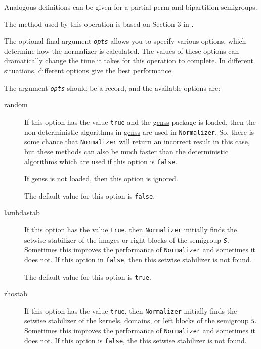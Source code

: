 \documentclass[a4paper,11pt]{report}
\begin{document}
{{{ Analogous definitions can be given for a partial perm and bipartition
semigroups.

 The method used by this operation is based on Section 3 in \cite{Araujo2010aa}.

 The optional final argument \mbox{\texttt{\mdseries\slshape opts}} allows you to specify various options, which determine how the normalizer is
calculated. The values of these options can dramatically change the time it
takes for this operation to complete. In different situations, different
options give the best performance. 

 The argument \mbox{\texttt{\mdseries\slshape opts}} should be a record, and the available options are: 
\begin{description}
\item[{random}]  If this option has the value \texttt{true} and the \href{ http://www-groups.mcs.st-and.ac.uk/~neunhoef/Computer/Software/Gap/genss.html } {genss} package is loaded, then the non-deterministic algorithms in \href{ http://www-groups.mcs.st-and.ac.uk/~neunhoef/Computer/Software/Gap/genss.html } {genss} are used in \texttt{Normalizer}. So, there is some chance that \texttt{Normalizer} will return an incorrect result in this case, but these methods can also be
much faster than the deterministic algorithms which are used if this option is \texttt{false}. 

 If \href{ http://www-groups.mcs.st-and.ac.uk/~neunhoef/Computer/Software/Gap/genss.html } {genss} is not loaded, then this option is ignored. 

 The default value for this option is \texttt{false}. 
\item[{lambdastab}]  If this option has the value \texttt{true}, then \texttt{Normalizer} initially finds the setwise stabilizer of the images or right blocks of the
semigroup \mbox{\texttt{\mdseries\slshape S}}. Sometimes this improves the performance of \texttt{Normalizer} and sometimes it does not. If this option in \texttt{false}, then this setwise stabilizer is not found. 

 The default value for this option is \texttt{true}. 
\item[{rhostab}]  If this option has the value \texttt{true}, then \texttt{Normalizer} initially finds the setwise stabilizer of the kernels, domains, or left blocks
of the semigroup \mbox{\texttt{\mdseries\slshape S}}. Sometimes this improves the performance of \texttt{Normalizer} and sometimes it does not. If this option is \texttt{false}, the this setwise stabilizer is not found. 


\end{description}}}}
\end{document}
